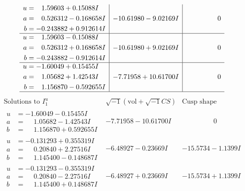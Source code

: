 \documentclass[1p]{elsarticle_modified}
\theoremstyle{definition}
\newcommand{\I}{\sqrt{-1}}
\begin{document}
$$\begin{array}{c|c|c}
\begin{aligned}
u &= \phantom{-}1.59603 + 0.15088 I \\
a &= \phantom{-}0.526312 - 0.168658 I \\
b &= -0.243882 + 0.912614 I\end{aligned}
 & -10.61980 - 9.02169 I & \phantom{-0.000000 } 0 \\ \hline\begin{aligned}
u &= \phantom{-}1.59603 - 0.15088 I \\
a &= \phantom{-}0.526312 + 0.168658 I \\
b &= -0.243882 - 0.912614 I\end{aligned}
 & -10.61980 + 9.02169 I & \phantom{-0.000000 } 0 \\ \hline\begin{aligned}
u &= -1.60049 + 0.15455 I \\
a &= \phantom{-}1.05682 + 1.42543 I \\
b &= \phantom{-}1.156870 - 0.592655 I\end{aligned}
 & -7.71958 + 10.61700 I & \phantom{-0.000000 } 0\\
 \hline 
 \end{array}$$\newpage$$\begin{array}{c|c|c}  
\text{Solutions to }I^u_{1}& \I (\text{vol} + \sqrt{-1}CS) & \text{Cusp shape}\\
 \hline 
\begin{aligned}
u &= -1.60049 - 0.15455 I \\
a &= \phantom{-}1.05682 - 1.42543 I \\
b &= \phantom{-}1.156870 + 0.592655 I\end{aligned}
 & -7.71958 - 10.61700 I & \phantom{-0.000000 } 0 \\ \hline\begin{aligned}
u &= -0.131293 + 0.355319 I \\
a &= \phantom{-}0.20840 + 2.27516 I \\
b &= \phantom{-}1.145400 - 0.148687 I\end{aligned}
 & -6.48927 - 0.23669 I & -15.5734 - 1.1399 I \\ \hline\begin{aligned}
u &= -0.131293 - 0.355319 I \\
a &= \phantom{-}0.20840 - 2.27516 I \\
b &= \phantom{-}1.145400 + 0.148687 I\end{aligned}
 & -6.48927 + 0.23669 I & -15.5734 + 1.1399 I \\ \hline\begin{aligned}

\end{aligned}
\end{array}$$
\end{document}
